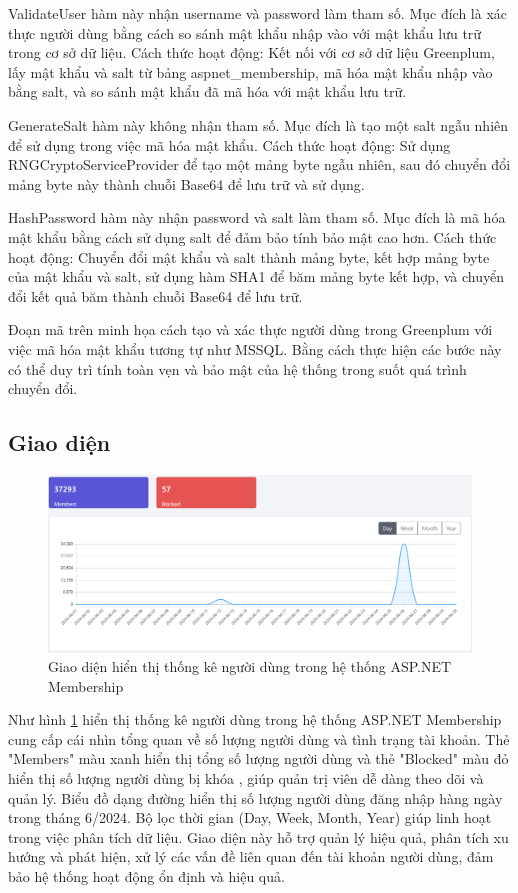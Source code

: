 \documentclass[14pt]{article}
\begin{document}
ValidateUser hàm này nhận username và password làm tham số. Mục đích là xác thực người dùng bằng cách so sánh mật khẩu nhập vào với mật khẩu lưu trữ trong cơ sở dữ liệu. Cách thức hoạt động: Kết nối với cơ sở dữ liệu Greenplum, lấy mật khẩu và salt từ bảng aspnet\_membership, mã hóa mật khẩu nhập vào bằng salt, và so sánh mật khẩu đã mã hóa với mật khẩu lưu trữ.


GenerateSalt hàm này không nhận tham số. Mục đích là tạo một salt ngẫu nhiên để sử dụng trong việc mã hóa mật khẩu. Cách thức hoạt động: Sử dụng RNGCryptoServiceProvider để tạo một mảng byte ngẫu nhiên, sau đó chuyển đổi mảng byte này thành chuỗi Base64 để lưu trữ và sử dụng.


HashPassword hàm này nhận password và salt làm tham số. Mục đích là mã hóa mật khẩu bằng cách sử dụng salt để đảm bảo tính bảo mật cao hơn. Cách thức hoạt động: Chuyển đổi mật khẩu và salt thành mảng byte, kết hợp mảng byte của mật khẩu và salt, sử dụng hàm SHA1 để băm mảng byte kết hợp, và chuyển đổi kết quả băm thành chuỗi Base64 để lưu trữ.

Đoạn mã trên minh họa cách tạo và xác thực người dùng trong Greenplum với việc mã hóa mật khẩu tương tự như MSSQL. Bằng cách thực hiện các bước này có thể duy trì tính toàn vẹn và bảo mật của hệ thống trong suốt quá trình chuyển đổi.

\subsection{Giao diện}

\begin{figure}
    \centering
    \includegraphics[width=0.5\linewidth]{images/day.png}
    \caption{Giao diện hiển thị thống kê người dùng trong hệ thống ASP.NET Membership}
    \label{fig:day}
\end{figure}

Như hình \ref{fig:day} hiển thị thống kê người dùng trong hệ thống ASP.NET Membership cung cấp cái nhìn tổng quan về số lượng người dùng và tình trạng tài khoản. Thẻ "Members" màu xanh hiển thị tổng số lượng người dùng và thẻ "Blocked" màu đỏ hiển thị số lượng người dùng bị khóa , giúp quản trị viên dễ dàng theo dõi và quản lý. Biểu đồ dạng đường hiển thị số lượng người dùng đăng nhập hàng ngày trong tháng 6/2024. Bộ lọc thời gian (Day, Week, Month, Year) giúp linh hoạt trong việc phân tích dữ liệu. Giao diện này hỗ trợ quản lý hiệu quả, phân tích xu hướng và phát hiện, xử lý các vấn đề liên quan đến tài khoản người dùng, đảm bảo hệ thống hoạt động ổn định và hiệu quả.
\end{document}
